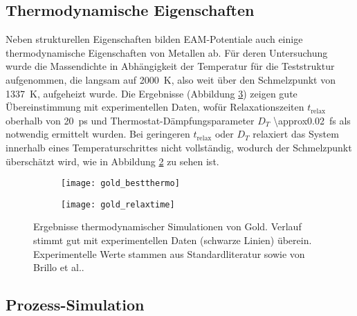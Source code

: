 
\subsection{Thermodynamische Eigenschaften}

Neben strukturellen Eigenschaften bilden EAM-Potentiale auch einige thermodynamische Eigenschaften von Metallen ab.
Für deren Untersuchung wurde die Massendichte in Abhängigkeit der Temperatur für die Teststruktur aufgenommen, die langsam auf \SI{2000}{\kelvin}, also weit über den Schmelzpunkt von \SI{1337}{\kelvin}, aufgeheizt wurde.
Die Ergebnisse (Abbildung \ref{fig:goldthermo}) zeigen gute Übereinstimmung mit experimentellen Daten, wofür Relaxationszeiten $t_\text{relax}$ oberhalb von \SI{20}{\pico\second} und Thermostat-Dämpfungsparameter $D_T$ \SI{\approx0.02}{\femto\second} als notwendig ermittelt wurden.
Bei geringeren $t_\text{relax}$ oder $D_T$ relaxiert das System innerhalb eines Temperaturschrittes nicht vollständig, wodurch der Schmelzpunkt überschätzt wird, wie in Abbildung \ref{fig:goldthermo-b} zu sehen ist.

\begin{figure}
  \captionsetup[subfigure]{singlelinecheck=false}
  \def\subfigwidth{7cm}
  \begin{subfigure}[t]{\subfigwidth}
    \texttt{[image: gold\_bestthermo]}
    \label{fig:goldthermo-a}
  \end{subfigure}
  \hfill
  \begin{subfigure}[t]{\subfigwidth}
    \texttt{[image: gold\_relaxtime]}
    \label{fig:goldthermo-b}
  \end{subfigure}
  \caption[Ergebnisse thermodynamischer Simulationen von Gold]{Ergebnisse thermodynamischer Simulationen von Gold.
    Verlauf stimmt gut mit experimentellen Daten (schwarze Linien) überein.
    Experimentelle Werte stammen aus Standardliteratur sowie von Brillo et al.\cite{brillo_density_2006}.
  }
  \label{fig:goldthermo}
\end{figure}

\subsection{Prozess-Simulation}

